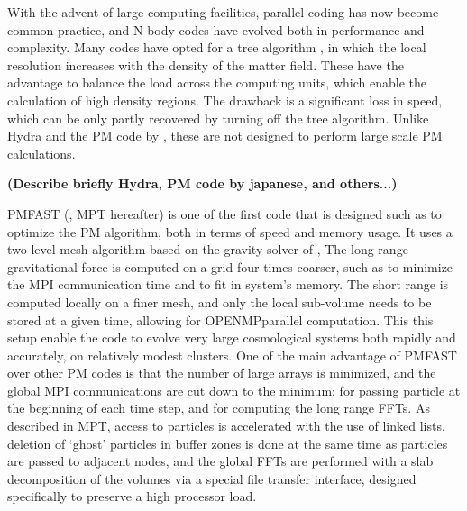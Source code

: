 With the advent of large computing facilities, parallel coding has now become common practice, 
and N-body codes have evolved both in performance and complexity. 
Many codes have opted for a tree algorithm \citep{Gadjet, Gadjet2, TPM, GOTPM}, in which 
the local resolution increases with the density of the matter field. 
These have the advantage to balance the load across the computing units, which enable the calculation of high density regions. 
The drawback is a significant loss in speed, which can be only partly recovered by turning off the tree algorithm. 
Unlike Hydra \citep{couchman1991} and the PM code by \cite{FerrelBertschinger1995},
 these are not designed to perform large scale PM calculations. 

{\bf (Describe briefly   Hydra, PM code by japanese, and others...)}


{\small PMFAST} (\cite{2005NewA...10..393M}, MPT hereafter) is one of the first code that is designed such as to optimize the PM algorithm,
both in terms of speed and memory usage. It uses a two-level mesh algorithm based on the gravity solver of \cite{TracPen2003},
The long range gravitational force is computed on a  grid four times coarser, such as to minimize the {\small MPI} communication time
and to fit in system's memory. The short range is computed locally on a finer mesh, and only the local sub-volume needs 
to be stored at a given time, allowing for {\small OPENMP}parallel computation.
This this setup enable the code to evolve very large cosmological systems both rapidly and accurately, on relatively modest clusters.
One of the main advantage of {\small PMFAST} over other PM codes is that the number of large arrays is minimized,
and the global {\small MPI} communications are cut down to the minimum: for passing particle at the beginning of each time step,
and  for computing the long range FFTs.
As described in MPT, access to particles is accelerated with the use of linked lists, deletion of `ghost' particles
in buffer zones is done at the same time as particles are passed to adjacent nodes,
and the global FFTs are performed with a slab decomposition of the volumes via a special file transfer interface, 
designed specifically to preserve a high processor load.

